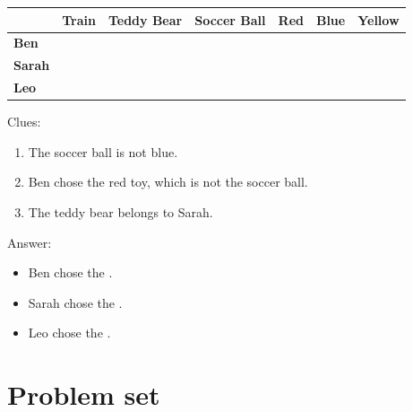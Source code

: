 \documentclass{tufte-book}
\providecommand{\tabularnewline}{\\}
\begin{document}
\begin{enumerate}
\begin{tabular}{|l|>{\centering}p{2cm}|>{\centering}p{2cm}|>{\centering}p{2cm}|>{\centering}p{2cm}|>{\centering}p{2cm}|>{\centering}p{2cm}|}
\hline 
  & \textbf{Train} & \textbf{Teddy Bear} & \textbf{Soccer Ball} & \textbf{Red} & \textbf{Blue} & \textbf{Yellow}\tabularnewline
\hline 
\hline 
\textbf{Ben} &  &  &  &  &  & \tabularnewline
\hline 
\textbf{Sarah} &  &  &  &  &  & \tabularnewline
\hline 
\textbf{Leo} &  &  &  &  &  & \tabularnewline
\hline 
\end{tabular}

Clues:
\begin{enumerate}
\item The soccer ball is not blue.
\item Ben chose the red toy, which is not the soccer ball.
\item The teddy bear belongs to Sarah.
\end{enumerate}

Answer:\bigskip
\begin{itemize}
\item Ben chose the \dotfill\bigskip.
\item Sarah chose the \dotfill\bigskip.
\item Leo chose the \dotfill\bigskip.
\end{itemize}

\end{enumerate}

\clearpage\section{Problem set }
\end{document}

